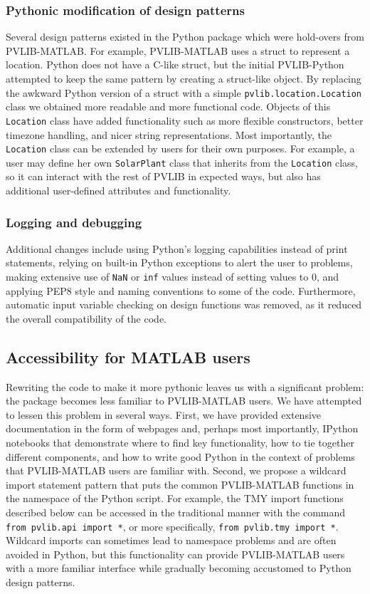 \documentclass[conference]{IEEEtran}
\begin{document}
\subsubsection{Pythonic modification of design patterns}
Several design patterns existed in the Python package which were hold-overs from PVLIB-MATLAB. 
For example, PVLIB-MATLAB uses a struct to represent a location. 
Python does not have a C-like struct, but the initial PVLIB-Python attempted to keep the same pattern by creating a struct-like object.
By replacing the awkward Python version of a struct with a simple \texttt{pvlib.location.Location} class we obtained more readable and more functional code.
Objects of this \texttt{Location} class have added functionality such as more flexible constructors, better timezone handling, and nicer string representations.
Most importantly, the \texttt{Location} class can be extended by users for their own purposes.
For example, a user may define her own \texttt{SolarPlant} class that inherits from the \texttt{Location} class, so it can interact with the rest of PVLIB in expected ways, but also has additional user-defined attributes and functionality.


\subsubsection{Logging and debugging}
Additional changes include using Python's logging capabilities instead of print statements, relying on built-in Python exceptions to alert the user to problems, making extensive use of \texttt{NaN} or \texttt{inf} values instead of setting values to 0, and applying PEP8 style and naming conventions \cite{pep8} to some of the code. 
Furthermore, automatic input variable checking on design functions was removed, as it reduced the overall compatibility of the code. 

\subsection{Accessibility for MATLAB users}
Rewriting the code to make it more pythonic leaves us with a significant problem: the package becomes less familiar to PVLIB-MATLAB users. 
We have attempted to lessen this problem in several ways.
First, we have provided extensive documentation in the form of webpages and, perhaps most importantly, IPython notebooks that demonstrate where to find key functionality, how to tie together different components, and how to write good Python in the context of problems that PVLIB-MATLAB users are familiar with.
Second, we propose a wildcard import statement pattern that puts the common PVLIB-MATLAB functions in the namespace of the Python script. 
For example, the TMY import functions described below can be accessed in the traditional manner with the command \texttt{from pvlib.api import *}, or more specifically, \texttt{from pvlib.tmy import *}. 
Wildcard imports can sometimes lead to namespace problems and are often avoided in Python, but this functionality can provide PVLIB-MATLAB users with a more familiar interface while gradually becoming accustomed to Python design patterns.
\end{document}
